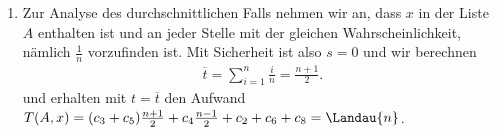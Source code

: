 \begin{solution}
\begin{enumerate}[label = (\arabic*)]
		\item Zur Analyse des durchschnittlichen Falls nehmen wir an, dass $x$ in der Liste $A$ enthalten ist und an jeder Stelle mit der gleichen Wahrscheinlichkeit, nämlich $\frac{1}{n}$ vorzufinden ist. Mit Sicherheit ist also $s = 0$ und wir berechnen 
		\begin{align*}
		\overline{t} = \sum_{i=1}^n \frac{i}{n} = \frac{n+1}{2}.
		\end{align*}
		und erhalten mit $t = \overline{t}$ den Aufwand $T(A,x) = (c_3 + c_5) \frac{n + 1}{2} + c_4 \frac{n - 1}{2} + c_2 + c_6 + c_8 = \Landau{n}$.
	\end{enumerate}
\end{solution}

